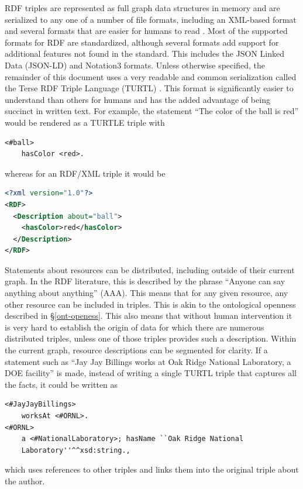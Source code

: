 RDF triples are represented as full graph data structures in memory and are
serialized to any one of a number of file formats, including an XML-based format
and several formats that are easier for humans to read \cite{noauthor_resource_2019}.
Most of the supported formats for RDF are standardized, although several formats
add support for additional features not found in the standard. This includes the
JSON Linked Data (JSON-LD) and Notation3 formats. Unless otherwise
specified, the remainder of this document uses a very readable and common
serialization called the Terse RDF Triple Language (TURTL)
\cite{noauthor_rdf_nodate-4}. This format is significantly easier to understand
than others for humans and has the added advantage of being succinct in written
text. For example, the statement ``The color of the ball is red'' would be
rendered as a TURTLE triple with \begin{lstlisting}[language=TURTL]
<#ball>
    hasColor <red>.
\end{lstlisting}
whereas for an RDF/XML triple it would be
\begin{lstlisting}[language=XML]
<?xml version="1.0"?>
<RDF>
  <Description about="ball">
    <hasColor>red</hasColor>
  </Description>
</RDF>
\end{lstlisting}

Statements about resources can be distributed, including outside of their
current graph. In the RDF literature, this is described by the phrase ``Anyone
can say anything about anything'' (AAA). This means that for any given resource,
any other resource can be included in triples. This is akin to the ontological
openness described in \S \ref{ont-openess}. This also means that without human
intervention it is very hard to establish the origin of data for which there are
numerous distributed triples, unless one of those triples provides such a
description. Within the current graph, resource descriptions can be segmented
for clarity. If a statement such as ``Jay Jay Billings works at Oak Ridge
National Laboratory, a DOE facility'' is made, instead of writing a single
TURTL triple that captures all the facts, it could be written as
\begin{lstlisting}[language=TURTL] <#JayJayBillings>
    worksAt <#ORNL>.
<#ORNL>
    a <#NationalLaboratory>; hasName ``Oak Ridge National
    Laboratory''^^xsd:string.,
\end{lstlisting}
which uses references to other triples and links them into the original triple
about the author.

